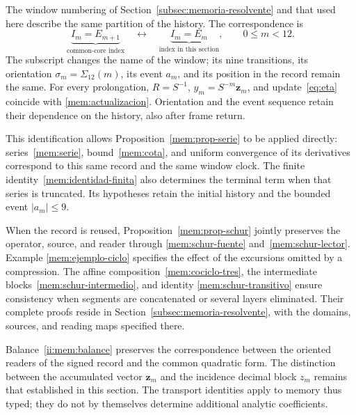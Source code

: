 The window numbering of Section~\ref{subsec:memoria-resolvente}
and that used here describe the same partition of the history. The
correspondence is
\[
 \underbrace{I_m=E_{m+1}}_{\text{common-core index}}
 \quad\longleftrightarrow\quad
 \underbrace{I_m=E_m}_{\text{index in this section}},
 \qquad 0\leq m<12.
\]
The subscript changes the name of the window; its nine transitions,
its orientation \(\sigma_m=\Sigma_{12}(m)\), its event \(a_m\), and
its position in the record remain the same. For every prolongation,
\(R=S^{-1}\), \(y_m=S^{-m}\mathbf z_m\), and
update~\eqref{eq:eta} coincide with
\eqref{mem:actualizacion}. Orientation and the event sequence
retain their dependence on the history, also after
frame return.

This identification allows Proposition~\ref{mem:prop-serie}
to be applied directly: series~\eqref{mem:serie},
bound~\eqref{mem:cota}, and uniform convergence of its derivatives
correspond to this same record and the same window clock. The
finite identity~\eqref{mem:identidad-finita} also determines the terminal
term when that series is truncated. Its hypotheses retain the initial history
and the bounded event \(|a_m|\leq9\).

When the record is reused, Proposition~\ref{mem:prop-schur} jointly
preserves the operator, source, and reader through
\eqref{mem:schur-fuente} and~\eqref{mem:schur-lector}. Example
\eqref{mem:ejemplo-ciclo} specifies the effect of the excursions omitted
by a compression. The affine composition~\eqref{mem:cociclo-tres}, the
intermediate blocks~\eqref{mem:schur-intermedio}, and identity
\eqref{mem:schur-transitivo} ensure consistency when segments
are concatenated or several layers eliminated. Their complete proofs reside
in Section~\ref{subsec:memoria-resolvente}, with the domains,
sources, and reading maps specified there.

Balance~\eqref{ii:mem:balance} preserves the correspondence between the
oriented readers of the signed record and the common quadratic form.
The distinction between the accumulated vector \(\mathbf z_m\) and the
incidence decimal block \(z_m\) remains that established in this section.
The transport identities apply to memory thus typed; they do not
by themselves determine additional analytic coefficients.
